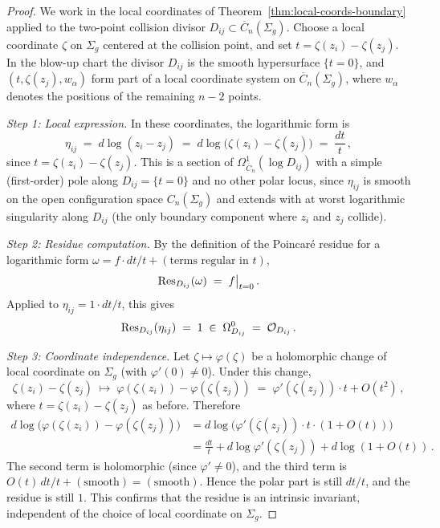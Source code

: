 \begin{proof}
We work in the local coordinates of Theorem~\ref{thm:local-coords-boundary}
applied to the two-point collision divisor $D_{ij}\subset\overline{C}_n(\Sigma_g)$.
Choose a local coordinate $\zeta$ on $\Sigma_g$ centered at the collision
point, and set $t = \zeta(z_i) - \zeta(z_j)$.  In the blow-up chart the
divisor $D_{ij}$ is the smooth hypersurface $\{t = 0\}$, and $(t, \zeta(z_j),
w_\alpha)$ form part of a local coordinate system on $\overline{C}_n(\Sigma_g)$,
where $w_\alpha$ denotes the positions of the remaining $n-2$ points.

\medskip
\noindent\emph{Step 1: Local expression.}
In these coordinates, the logarithmic form is
\[
\eta_{ij} \;=\; d\log(z_i - z_j) \;=\; d\log\!\bigl(\zeta(z_i)-\zeta(z_j)\bigr)
\;=\; \frac{dt}{t}\,,
\]
since $t = \zeta(z_i) - \zeta(z_j)$.  This is a section of
$\Omega^1_{\overline{C}_n}(\log D_{ij})$ with a simple (first-order) pole along
$D_{ij} = \{t=0\}$ and no other polar locus, since $\eta_{ij}$ is smooth on the
open configuration space $C_n(\Sigma_g)$ and extends with at worst logarithmic
singularity along $D_{ij}$ (the only boundary component where $z_i$ and $z_j$ collide).

\medskip
\noindent\emph{Step 2: Residue computation.}
By the definition of the Poincar\'e residue for a logarithmic form
$\omega = f \cdot dt/t + (\text{terms regular in } t)$,
\[
\operatorname{Res}_{D_{ij}}(\omega) \;=\; f\big|_{t=0}\,.
\]
Applied to $\eta_{ij} = 1 \cdot dt/t$, this gives
\[
\operatorname{Res}_{D_{ij}}(\eta_{ij}) \;=\; 1 \;\in\; \Omega^0_{D_{ij}}
\;=\; \mathcal{O}_{D_{ij}}\,.
\]

\medskip
\noindent\emph{Step 3: Coordinate independence.}
Let $\zeta \mapsto \varphi(\zeta)$ be a holomorphic change of local coordinate
on $\Sigma_g$ (with $\varphi'(0) \neq 0$).  Under this change,
\[
\zeta(z_i) - \zeta(z_j) \;\longmapsto\;
\varphi(\zeta(z_i)) - \varphi(\zeta(z_j))
\;=\; \varphi'(\zeta(z_j))\cdot t + O(t^2)\,,
\]
where $t = \zeta(z_i) - \zeta(z_j)$ as before.  Therefore
\begin{align*}
d\log\bigl(\varphi(\zeta(z_i)) - \varphi(\zeta(z_j))\bigr)
&= d\log\bigl(\varphi'(\zeta(z_j))\cdot t \cdot (1 + O(t))\bigr) \\
&= \frac{dt}{t} + d\log\varphi'(\zeta(z_j))
+ d\log(1+O(t))\,.
\end{align*}
The second term is holomorphic (since $\varphi' \neq 0$), and the third
term is $O(t)\,dt/t + (\text{smooth}) = (\text{smooth})$.  Hence the polar part
is still $dt/t$, and the residue is still $1$.  This confirms that the
residue is an intrinsic invariant, independent of the choice of local
coordinate on $\Sigma_g$.
\end{proof}

